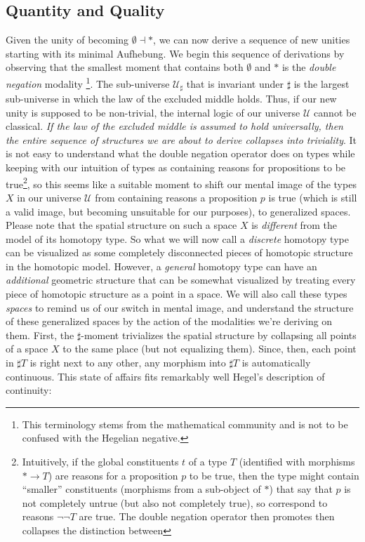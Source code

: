 \documentclass{article}
\begin{document}
\subsection{Quantity and Quality}
Given the unity of becoming $\emptyset\dashv *$, we can now derive a sequence of new unities starting with its minimal Aufhebung. We begin this sequence of derivations by observing that the smallest moment that contains both $\emptyset$ and $*$ is the \emph{double negation} modality\cite{Sketches} \footnote{This terminology stems from the mathematical community and is not to be confused with the Hegelian negative.}. The sub-universe $\mathcal{U}_\sharp$ that is invariant under $\sharp$ is the largest sub-universe in which the law of the excluded middle holds. Thus, if our new unity is supposed to be non-trivial, the internal logic of our universe $\mathcal{U}$ cannot be classical. \emph{If the law of the excluded middle is assumed to hold universally, then the entire sequence of structures we are about to derive collapses into triviality}. It is not easy to understand what the double negation operator does on types while keeping with our intuition of types as containing reasons for propositions to be true\footnote{Intuitively, if the global constituents $t$ of a type $T$ (identified with morphisms $*\rightarrow T$) are reasons for a proposition $p$ to be true, then the type might contain ``smaller'' constituents (morphisms from a sub-object of $*$) that say that $p$ is not completely untrue (but also not completely true), so correspond to reasons $\neg\neg T$ are true. The double negation operator then promotes then collapses the distinction between }, so this seems like a suitable moment to shift our mental image of the types $X$ in our universe $\mathcal{U}$ from containing reasons a proposition $p$ is true (which is still a valid image, but becoming unsuitable for our purposes), to generalized spaces. Please note that the spatial structure on such a space $X$ is \emph{different} from the model of its homotopy type. So what we will now call a \emph{discrete} homotopy type can be visualized as some completely disconnected pieces of homotopic structure in the homotopic model. However, a \emph{general} homotopy type can have an \emph{additional} geometric structure that can be somewhat visualized by treating every piece of homotopic structure as a point in a space. We will also call these types \emph{spaces} to remind us of our switch in mental image, and understand the structure of these generalized spaces by the action of the modalities we're deriving on them. First, the $\sharp$-moment trivializes the spatial structure by collapsing all points of a space $X$ to the same place (but not equalizing them). Since, then, each point in $\sharp T$ is right next to any other, any morphism into $\sharp T$ is automatically continuous. This state of affairs fits remarkably well Hegel's description of continuity:
\end{document}
